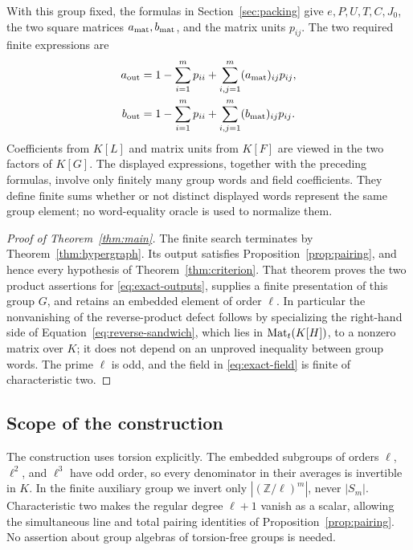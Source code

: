 With this group fixed, the formulas in Section~\ref{sec:packing} give $e,P,U,T,C,J_0$, the two square matrices $a_{\rm mat},b_{\rm mat}$, and the matrix units $p_{ij}$. The two required finite expressions are
\begin{equation}
\label{eq:exact-outputs}
\begin{split}
a_{\mathrm{out}}&=1-\sum_{i=1}^m p_{ii}
 +\sum_{i,j=1}^m(a_{\rm mat})_{ij}p_{ij},\\
b_{\mathrm{out}}&=1-\sum_{i=1}^m p_{ii}
 +\sum_{i,j=1}^m(b_{\rm mat})_{ij}p_{ij}.
\end{split}
\end{equation}
Coefficients from $K[L]$ and matrix units from $K[F]$ are viewed in the two factors of $K[G]$. The displayed expressions, together with the preceding formulas, involve only finitely many group words and field coefficients. They define finite sums whether or not distinct displayed words represent the same group element; no word-equality oracle is used to normalize them.

\begin{proof}[Proof of Theorem~\ref{thm:main}]
The finite search terminates by Theorem~\ref{thm:hypergraph}. Its output satisfies Proposition~\ref{prop:pairing}, and hence every hypothesis of Theorem~\ref{thm:criterion}. That theorem proves the two product assertions for \eqref{eq:exact-outputs}, supplies a finite presentation of this group $G$, and retains an embedded element of order $\ell$. In particular the nonvanishing of the reverse-product defect follows by specializing the right-hand side of Equation~\eqref{eq:reverse-sandwich}, which lies in $\operatorname{Mat}_t(K[H])$, to a nonzero matrix over $K$; it does not depend on an unproved inequality between group words. The prime $\ell$ is odd, and the field in \eqref{eq:exact-field} is finite of characteristic two.
\end{proof}

\subsection{Scope of the construction}

The construction uses torsion explicitly. The embedded subgroups of orders $\ell$, $\ell^2$, and $\ell^3$ have odd order, so every denominator in their averages is invertible in $K$. In the finite auxiliary group we invert only $|(\mathbb Z/\ell)^m|$, never $|S_m|$. Characteristic two makes the regular degree $\ell+1$ vanish as a scalar, allowing the simultaneous line and total pairing identities of Proposition~\ref{prop:pairing}. No assertion about group algebras of torsion-free groups is needed.

